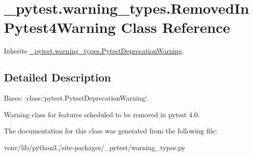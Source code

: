 \hypertarget{class__pytest_1_1warning__types_1_1_removed_in_pytest4_warning}{}\section{\+\_\+pytest.\+warning\+\_\+types.\+Removed\+In\+Pytest4\+Warning Class Reference}
\label{class__pytest_1_1warning__types_1_1_removed_in_pytest4_warning}


Inherits \hyperlink{class__pytest_1_1warning__types_1_1_pytest_deprecation_warning}{\+\_\+pytest.\+warning\+\_\+types.\+Pytest\+Deprecation\+Warning}.



\subsection{Detailed Description}
\begin{DoxyVerb}Bases: :class:`pytest.PytestDeprecationWarning`.

Warning class for features scheduled to be removed in pytest 4.0.
\end{DoxyVerb}
 

The documentation for this class was generated from the following file\+:\begin{DoxyCompactItemize}
\item 
venv/lib/python3./site-\/packages/\+\_\+pytest/warning\+\_\+types.\+py\end{DoxyCompactItemize}
